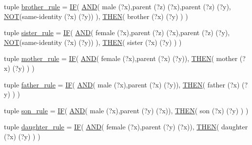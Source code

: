 \begin{DoxyCompactItemize}
\item 
tuple \hyperlink{namespacelab1_a2a12c1747bc9ea2b9438e91ff8de062f}{brother\+\_\+rule} = \hyperlink{classproduction_1_1_i_f}{I\+F}( \hyperlink{classproduction_1_1_a_n_d}{A\+N\+D}( \textquotesingle{}male (?x)\textquotesingle{},\textquotesingle{}parent (?z) (?x)\textquotesingle{},\textquotesingle{}parent (?z) (?y)\textquotesingle{}, \hyperlink{classproduction_1_1_n_o_t}{N\+O\+T}(\textquotesingle{}same-\/identity (?x) (?y)\textquotesingle{}) ), \hyperlink{classproduction_1_1_t_h_e_n}{T\+H\+E\+N}( \textquotesingle{}brother (?x) (?y)\textquotesingle{} ) )
\item 
tuple \hyperlink{namespacelab1_af4f117ff665235f6bade3d725b728f59}{sister\+\_\+rule} = \hyperlink{classproduction_1_1_i_f}{I\+F}( \hyperlink{classproduction_1_1_a_n_d}{A\+N\+D}( \textquotesingle{}female (?x)\textquotesingle{},\textquotesingle{}parent (?z) (?x)\textquotesingle{},\textquotesingle{}parent (?z) (?y)\textquotesingle{}, \hyperlink{classproduction_1_1_n_o_t}{N\+O\+T}(\textquotesingle{}same-\/identity (?x) (?y)\textquotesingle{}) ), \hyperlink{classproduction_1_1_t_h_e_n}{T\+H\+E\+N}( \textquotesingle{}sister (?x) (?y)\textquotesingle{} ) )
\item 
tuple \hyperlink{namespacelab1_ab6b172e48334828812e03a3a574b30e2}{mother\+\_\+rule} = \hyperlink{classproduction_1_1_i_f}{I\+F}( \hyperlink{classproduction_1_1_a_n_d}{A\+N\+D}( \textquotesingle{}female (?x)\textquotesingle{},\textquotesingle{}parent (?x) (?y)\textquotesingle{}), \hyperlink{classproduction_1_1_t_h_e_n}{T\+H\+E\+N}( \textquotesingle{}mother (?x) (?y)\textquotesingle{} ) )
\item 
tuple \hyperlink{namespacelab1_abc6ad6a1170b6579aaeb533235ca881a}{father\+\_\+rule} = \hyperlink{classproduction_1_1_i_f}{I\+F}( \hyperlink{classproduction_1_1_a_n_d}{A\+N\+D}( \textquotesingle{}male (?x)\textquotesingle{},\textquotesingle{}parent (?x) (?y)\textquotesingle{}), \hyperlink{classproduction_1_1_t_h_e_n}{T\+H\+E\+N}( \textquotesingle{}father (?x) (?y)\textquotesingle{} ) )
\item 
tuple \hyperlink{namespacelab1_a2a1ea2c1c23fef0cfcd295caf1235fc0}{son\+\_\+rule} = \hyperlink{classproduction_1_1_i_f}{I\+F}( \hyperlink{classproduction_1_1_a_n_d}{A\+N\+D}( \textquotesingle{}male (?x)\textquotesingle{},\textquotesingle{}parent (?y) (?x)\textquotesingle{}), \hyperlink{classproduction_1_1_t_h_e_n}{T\+H\+E\+N}( \textquotesingle{}son (?x) (?y)\textquotesingle{} ) )
\item 
tuple \hyperlink{namespacelab1_a326d672f8f3e2d6fbd42c1f9208b25c6}{daughter\+\_\+rule} = \hyperlink{classproduction_1_1_i_f}{I\+F}( \hyperlink{classproduction_1_1_a_n_d}{A\+N\+D}( \textquotesingle{}female (?x)\textquotesingle{},\textquotesingle{}parent (?y) (?x)\textquotesingle{}), \hyperlink{classproduction_1_1_t_h_e_n}{T\+H\+E\+N}( \textquotesingle{}daughter (?x) (?y)\textquotesingle{} ) )

\end{DoxyCompactItemize}
